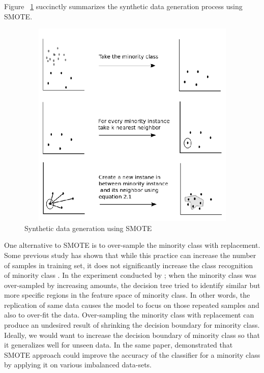 Figure ~\ref{fig:SMOTE} succinctly summarizes the synthetic data generation process using SMOTE.

\begin{figure}[ht]
	\begin{center}
		\includegraphics[width=12cm,height=10cm,keepaspectratio]{images/SMOTE_2.png}
		\caption{Synthetic data generation using SMOTE}
		\label{fig:SMOTE}
	\end{center}
\end{figure} 

One alternative to SMOTE is to over-sample the minority class with replacement. Some previous study has shown that while this practice can increase the number of samples in training set, it does not significantly increase the class recognition of minority class \citep{chawla2002smote}. In the experiment conducted by \citet{chawla2002smote}; when the minority class was over-sampled by increasing amounts, the decision tree tried to identify similar but more specific regions in the feature space of minority class. In other words, the replication of same data causes the model to focus on those repeated samples and also to over-fit the data. Over-sampling the minority class with replacement can produce an undesired result of shrinking the decision boundary for minority class. Ideally, we would want to increase the decision boundary of minority class so that it generalizes well for unseen data. In the same paper, \citet{chawla2002smote} demonstrated that SMOTE approach could improve the accuracy of the classifier for a minority class by applying it on various imbalanced data-sets.

